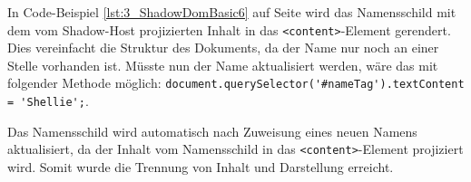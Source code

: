 \begin{enumerate}
In Code-Beispiel \ref{lst:3_ShadowDomBasic6} auf Seite \pageref{lst:3_ShadowDomBasic6} wird das Namensschild mit dem vom Shadow-Host projizierten Inhalt in das \lstinline|<content>|-Element gerendert. Dies vereinfacht die Struktur des Dokuments, da der Name nur noch an einer Stelle vorhanden ist. Müsste nun der Name aktualisiert werden, wäre das mit folgender Methode möglich: \lstinline|document.querySelector('#nameTag').textContent = 'Shellie';|.

Das Namensschild wird automatisch nach Zuweisung eines neuen Namens aktualisiert, da der Inhalt vom Namensschild in das \lstinline|<content>|-Element projiziert wird. Somit wurde die Trennung von Inhalt und Darstellung erreicht.
\end{enumerate}